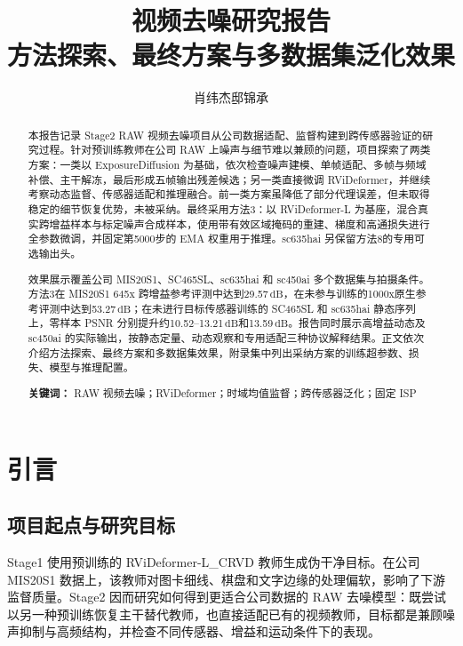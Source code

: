 \documentclass[11pt,a4paper,UTF8,fontset=fandol]{ctexart}
\title{\textbf{视频去噪研究报告}\\[0.4em]
\large 方法探索、最终方案与多数据集泛化效果}
\author{肖纬杰\quad 邸锦承}
\date{}
\newcommand{\db}{\ensuremath{\,\mathrm{dB}}}
\begin{document}
\maketitle
\begin{abstract}
\noindent
本报告记录 Stage2 RAW 视频去噪项目从公司数据适配、监督构建到跨传感器验证的研究过程。针对预训练教师在公司 RAW 上噪声与细节难以兼顾的问题，项目探索了两类方案：一类以 ExposureDiffusion 为基础，依次检查噪声建模、单帧适配、多帧与频域补偿、主干解冻，最后形成五帧输出残差候选；另一类直接微调 RViDeformer，并继续考察动态监督、传感器适配和推理融合。前一类方案虽降低了部分代理误差，但未取得稳定的细节恢复优势，未被采纳。最终采用方法3：以 RViDeformer-L 为基座，混合真实跨增益样本与标定噪声合成样本，使用带有效区域掩码的重建、梯度和高通损失进行全参数微调，并固定第5000步的 EMA 权重用于推理。sc635hai 另保留方法8的专用可选输出头。

效果展示覆盖公司 MIS20S1、SC465SL、sc635hai 和 sc450ai 多个数据集与拍摄条件。方法3在 MIS20S1 645x 跨增益参考评测中达到29.57\db，在未参与训练的1000x原生参考评测中达到53.27\db；在未进行目标传感器训练的 SC465SL 和 sc635hai 静态序列上，零样本 PSNR 分别提升约10.52--13.21\db 和13.59\db。报告同时展示高增益动态及 sc450ai 的实际输出，按静态定量、动态观察和专用适配三种协议解释结果。正文依次介绍方法探索、最终方案和多数据集效果，附录集中列出采纳方案的训练超参数、损失、模型与推理配置。

\vspace{0.6em}
\noindent\textbf{关键词：} RAW 视频去噪；RViDeformer；时域均值监督；跨传感器泛化；固定 ISP
\end{abstract}

\newpage
{\footnotesize\setlength{\parskip}{0pt}\setlength{\baselineskip}{11pt}\tableofcontents}
\newpage

\section{引言}

\subsection{项目起点与研究目标}

Stage1 使用预训练的 RViDeformer-L\_CRVD 教师生成伪干净目标。在公司 MIS20S1 数据上，该教师对图卡细线、棋盘和文字边缘的处理偏软，影响了下游监督质量。Stage2 因而研究如何得到更适合公司数据的 RAW 去噪模型：既尝试以另一种预训练恢复主干替代教师，也直接适配已有的视频教师，目标都是兼顾噪声抑制与高频结构，并检查不同传感器、增益和运动条件下的表现。
\end{document}
